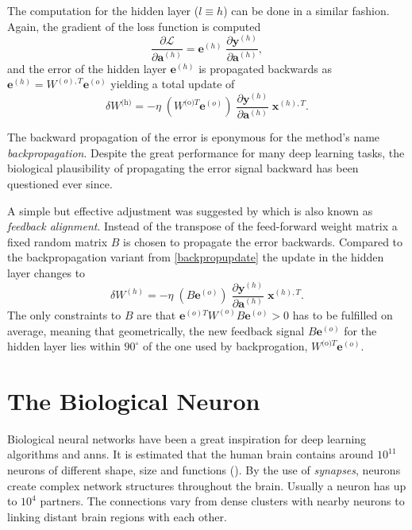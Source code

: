 The computation for the hidden layer ($l\equiv h$) can be done in a similar fashion. Again, the gradient of the loss function is computed
\begin{equation*}
\frac{\partial\mathcal{L}}{\partial \mathbf{a}^{(h)}} = \mathbf{e}^{(h)} \;
\frac{\partial \mathbf{y}^{(h)} }{\partial \mathbf{a}^{(h)}},
\end{equation*}
and the error of the hidden layer $\mathbf{e}^{(h)}$ is propagated backwards as $\mathbf{e}^{(h)}=W^{(o),T}\mathbf{e}^{(o)}$ yielding a total update of
\begin{equation*}
\delta W^{\text{(h)}} = - \eta \;
\left(W^{\text{(o)}T} \mathbf{e}^{(o)}\right) \;
\frac{\partial \mathbf{y}^{(h)} }{\partial \mathbf{a}^{(h)}} \; \mathbf{x}^{(h), T}.
\end{equation*}

The backward propagation of the error is eponymous for the method's name \textit{backpropagation}. Despite the great performance for many deep learning tasks, the biological plausibility of propagating the error signal backward has been questioned ever since.

A simple but effective adjustment was suggested by \citealp{lillicrap2016random} which is also known as \textit{feedback alignment}. Instead of the transpose of the feed-forward weight matrix a fixed random matrix $B$ is chosen to propagate the error backwards. Compared to the backpropagation variant from \cref{backpropupdate} the update in the hidden layer changes to
\begin{equation*}
\delta W^{(h)} = - \eta \;
(B \mathbf{e}^{(o)}) \;
\frac{\partial \mathbf{y}^{(h)}}{\partial \mathbf{a}^{(h)}} \;
\mathbf{x}^{(h),T}.
\end{equation*}
The only constraints to $B$ are that $\mathbf{e}^{(o)T} W^{(o)} B \mathbf{e}^{(o)} > 0$ has to be fulfilled on average, meaning that geometrically, the new feedback signal $B \mathbf{e}^{(o)}$ for the hidden layer lies within $90^{\circ}$ of the one used by backprogation, $W^{\text{(o)}T} \mathbf{e}^{(o)}$.


\section{The Biological Neuron}

Biological neural networks have been a great inspiration for deep learning algorithms and \glspl{ann}. It is estimated that the human brain contains around $10^{11}$ neurons of different shape, size and functions (\citealp{numberofneurons}). By the use of \emph{synapses}, neurons create complex network structures throughout the brain. Usually a neuron has up to $10^4$ partners. The connections vary from dense clusters with nearby neurons to linking distant brain regions with each other.

